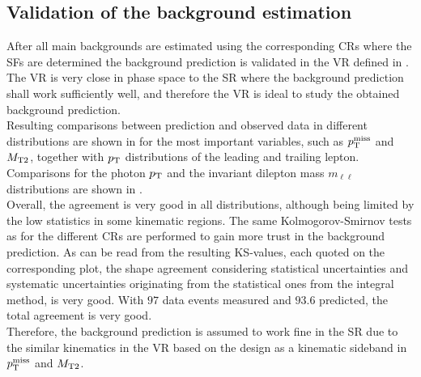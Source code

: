 \subsection{Validation of the background estimation}\label{sec:Validation}
After all main backgrounds are estimated using the corresponding CRs where the SFs are determined the background prediction is validated in the VR defined in . The VR is very close in phase space to the SR where the background prediction shall work sufficiently well, and therefore the VR is ideal to study the obtained background prediction.\\
Resulting comparisons between prediction and observed data in different distributions are shown in  for the most important variables, such as $p_{\mathrm{T}}^\text{miss}$ and $M_{\mathrm{T2}}$, together with $p_{\mathrm{T}}$ distributions of the leading and trailing lepton. Comparisons for the photon $p_{\mathrm{T}}$ and the invariant dilepton mass $m_{\ell\ell}$ distributions are shown in .\\
Overall, the agreement is very good in all distributions, although being limited by the low statistics in some kinematic regions. The same Kolmogorov-Smirnov tests as for the different CRs are performed to gain more trust in the background prediction. As can be read from the resulting KS-values, each quoted on the corresponding plot, the shape agreement considering statistical uncertainties and systematic uncertainties originating from the statistical ones from the integral method, is very good. With $97$ data events measured and $93.6$ predicted, the total agreement is very good.\\
Therefore, the background prediction is assumed to work fine in the SR due to the similar kinematics in the VR based on the design as a kinematic sideband in $p_{\mathrm{T}}^\text{miss}$ and $M_{\mathrm{T2}}$.
